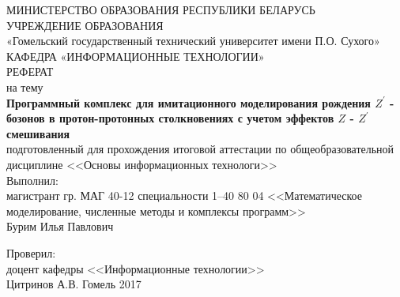\begin{titlepage}
	\large
	\begin{center}
		\vspace{3mm}
		МИНИСТЕРСТВО ОБРАЗОВАНИЯ РЕСПУБЛИКИ БЕЛАРУСЬ\\
		УЧРЕЖДЕНИЕ ОБРАЗОВАНИЯ\\
		«Гомельский государственный технический университет имени П.О. Сухого»\\
		\vspace{10mm}
		КАФЕДРА «ИНФОРМАЦИОННЫЕ ТЕХНОЛОГИИ»\\
		\vspace{30mm}
		РЕФЕРАТ\\
		на тему\\
			\textbf{ Программный комплекс для имитационного моделирования рождения $Z^\prime$ - бозонов в протон-протонных столкновениях с учетом эффектов $Z$ - $Z^\prime$ смешивания
		}\\
	\vspace{5mm}
		подготовленный для прохождения итоговой аттестации 
		по общеобразовательной дисциплине 
		<<Основы информационных технологи>>\\
	\vspace{40mm}
		Выполнил:\\
		магистрант гр. МАГ 40-12
		специальности 1–40 80 04 <<Математическое моделирование, численные методы и комплексы программ>>\\
		Бурим Илья Павлович
		
	\vspace{15mm}
		Проверил:\\
		доцент кафедры <<Информационные технологии>>\\
		Цитринов А.В.
	\vfill
		Гомель 2017
	\end{center}
\end{titlepage}
